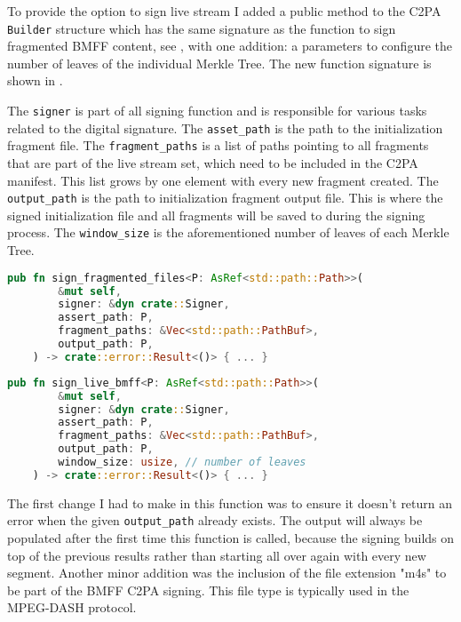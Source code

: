 To provide the option to sign live stream I added a public method to the C2PA \texttt{Builder} structure which has the same signature as the function to sign fragmented BMFF content, see , with one addition: a parameters to configure the number of leaves of the individual Merkle Tree. The new function signature is shown in .

The \texttt{signer} is part of all signing function and is responsible for various tasks related to the digital signature. The \texttt{asset\_path} is the path to the initialization fragment file. The \texttt{fragment\_paths} is a list of paths pointing to all fragments that are part of the live stream set, which need to be included in the C2PA manifest. This list grows by one element with every new fragment created. The \texttt{output\_path} is the path to initialization fragment output file. This is where the signed initialization file and all fragments will be saved to during the signing process. The \texttt{window\_size} is the aforementioned number of leaves of each Merkle Tree. 

\begin{minipage}{\linewidth}
\begin{lstlisting}[caption={Original Signing Function}, label=code:fragment_bmff, language=Rust, captionpos=b]
    pub fn sign_fragmented_files<P: AsRef<std::path::Path>>(
        &mut self,
        signer: &dyn crate::Signer,
        assert_path: P,
        fragment_paths: &Vec<std::path::PathBuf>,
        output_path: P,
    ) -> crate::error::Result<()> { ... }
\end{lstlisting}
\end{minipage}

\begin{minipage}{\linewidth}
\begin{lstlisting}[caption={New Live Signing Function}, label=code:live_sign, language=Rust, captionpos=b]
    pub fn sign_live_bmff<P: AsRef<std::path::Path>>(
        &mut self,
        signer: &dyn crate::Signer,
        assert_path: P,
        fragment_paths: &Vec<std::path::PathBuf>,
        output_path: P,
        window_size: usize, // number of leaves
    ) -> crate::error::Result<()> { ... }
\end{lstlisting}
\end{minipage}

The first change I had to make in this function was to ensure it doesn't return an error when the given \texttt{output\_path} already exists. The output will always be populated after the first time this function is called, because the signing builds on top of the previous results rather than starting all over again with every new segment. Another minor addition was the inclusion of the file extension "m4s" to be part of the BMFF C2PA signing. This file type is typically used in the MPEG-DASH protocol.

